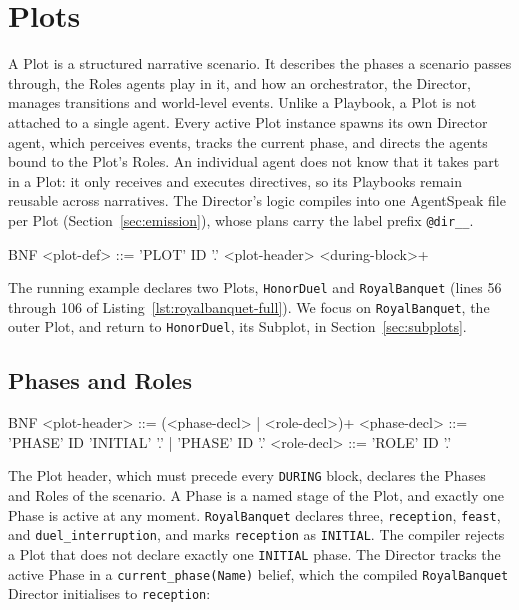 \section{Plots}
\label{sec:plots}
A Plot is a structured narrative scenario. It describes the phases a scenario passes through, the Roles agents play in it, and how an orchestrator, the Director, manages transitions and world-level events. Unlike a Playbook, a Plot is not attached to a single agent. Every active Plot instance spawns its own Director agent, which perceives events, tracks the current phase, and directs the agents bound to the Plot's Roles. An individual agent does not know that it takes part in a Plot: it only receives and executes directives, so its Playbooks remain reusable across narratives. The Director's logic compiles into one AgentSpeak file per Plot (Section~\ref{sec:emission}), whose plans carry the label prefix \lstinline|@dir__|.
 
\begin{codeblock}[]{BNF}
    <plot-def>   ::= 'PLOT' ID '.' <plot-header> <during-block>+
\end{codeblock}
 
The running example declares two Plots, \lstinline|HonorDuel| and \lstinline|RoyalBanquet| (lines 56 through 106 of Listing~\ref{lst:royalbanquet-full}). We focus on \lstinline|RoyalBanquet|, the outer Plot, and return to \lstinline|HonorDuel|, its Subplot, in Section~\ref{sec:subplots}.
 
\subsection{Phases and Roles}
\label{sec:plot-header}
\begin{codeblock}[]{BNF}
    <plot-header>  ::= (<phase-decl> | <role-decl>)+
    <phase-decl>   ::= 'PHASE' ID 'INITIAL' '.' | 'PHASE' ID '.'
    <role-decl>    ::= 'ROLE' ID '.'
\end{codeblock}
 
The Plot header, which must precede every \lstinline|DURING| block, declares the Phases and Roles of the scenario. A Phase is a named stage of the Plot, and exactly one Phase is active at any moment. \lstinline|RoyalBanquet| declares three, \lstinline|reception|, \lstinline|feast|, and \lstinline|duel_interruption|, and marks \lstinline|reception| as \lstinline|INITIAL|. The compiler rejects a Plot that does not declare exactly one \lstinline|INITIAL| phase. The Director tracks the active Phase in a \lstinline|current_phase(Name)| belief, which the compiled \lstinline|RoyalBanquet| Director initialises to \lstinline|reception|:
 
